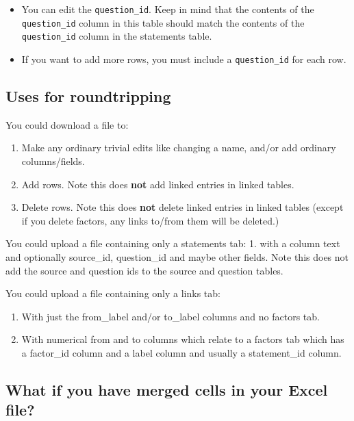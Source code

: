 \documentclass[
]{book}
\providecommand{\tightlist}{%
  \setlength{\itemsep}{0pt}\setlength{\parskip}{0pt}}
\begin{document}
\begin{itemize}
  \begin{itemize}
  \tightlist
  \item
    You can edit the \texttt{question\_id}. Keep in mind that the contents of the \texttt{question\_id} column in this table should match the contents of the \texttt{question\_id} column in the statements table.
  \item
    If you want to add more rows, you must include a \texttt{question\_id} for each row.
  \end{itemize}
\end{itemize}

\hypertarget{uses-for-roundtripping}{%
\subsection{Uses for roundtripping}\label{uses-for-roundtripping}}

You could download a file to:

\begin{enumerate}
\def\labelenumi{\arabic{enumi}.}
\tightlist
\item
  Make any ordinary trivial edits like changing a name, and/or add ordinary columns/fields.
\item
  Add rows. Note this does \textbf{not} add linked entries in linked tables.
\item
  Delete rows. Note this does \textbf{not} delete linked entries in linked tables (except if you delete factors, any links to/from them will be deleted.)
\end{enumerate}

You could upload a file containing only a statements tab:
1. with a column text and optionally source\_id, question\_id and maybe other fields. Note this does not add the source and question ids to the source and question tables.

You could upload a file containing only a links tab:

\begin{enumerate}
\def\labelenumi{\arabic{enumi}.}
\tightlist
\item
  With just the from\_label and/or to\_label columns and no factors tab.
\item
  With numerical from and to columns which relate to a factors tab which has a factor\_id column and a label column and usually a statement\_id column.
\end{enumerate}

\hypertarget{what-if-you-have-merged-cells-in-your-excel-file}{%
\subsection{What if you have merged cells in your Excel file?}\label{what-if-you-have-merged-cells-in-your-excel-file}}
\end{document}
